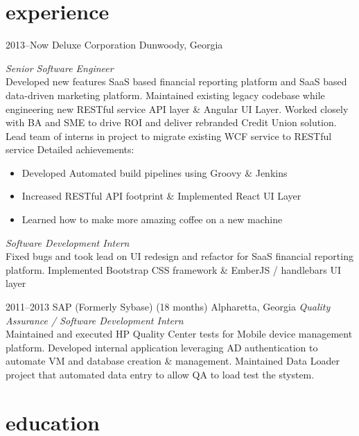 \documentclass[]{friggeri-cv} %
\begin{document}
\section{experience}
\begin{entrylist}


\entry
{2013--Now}
{Deluxe Corporation}
{Dunwoody, Georgia}
{\emph{Senior Software Engineer} \\
Developed new features SaaS based financial reporting platform and SaaS based data-driven marketing platform.
Maintained existing legacy codebase while engineering new RESTful service API layer \& Angular UI Layer.
Worked closely with BA and SME to drive ROI and deliver rebranded Credit Union solution.
Lead team of interns in project to migrate existing WCF service to RESTful service
Detailed achievements:
\begin{itemize}
\item Developed Automated build pipelines using Groovy \& Jenkins
\item Increased RESTful API footprint \& Implemented React UI Layer
\item Learned how to make more amazing coffee on a new machine
\end{itemize}
\emph{Software Development Intern} \\
Fixed bugs and took lead on UI redesign and refactor for SaaS financial reporting platform.
Implemented Bootstrap CSS framework \& EmberJS / handlebars UI layer }
\entry
{2011--2013}
{SAP (Formerly Sybase) (18 months)}
{Alpharetta, Georgia}
{\emph{Quality Assurance / Software Development Intern} \\
Maintained and executed HP Quality Center tests for Mobile device management platform.
Developed internal application leveraging AD authentication to automate VM and database creation \& management.
Maintained Data Loader project that automated data entry to allow QA to load test the stystem. }

\end{entrylist}


\section{education}
\end{document}

